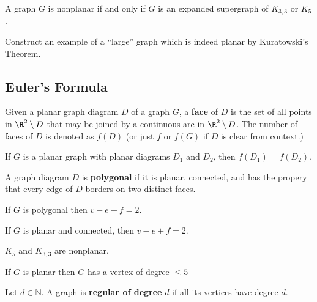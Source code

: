 \begin{theorem} A graph $G$ is nonplanar if and only if $G$ is an expanded supergraph of $K_{3,3}$ or $K_5$.
\end{theorem}

\begin{example} Construct an example of a ``large'' graph which is indeed planar by Kuratowski's Theorem.
\end{example}

\subsection{Euler's Formula}
\begin{definition} Given a planar graph diagram $D$ of a graph $G$, a \textbf{face} of $D$ is the set of all points in $\R^2 \setminus D$ that may be joined by a continuous arc in $\R^2 \setminus D$.  The number of faces of $D$ is denoted as $f(D)$ (or just $f$ or $f(G)$ if $D$ is clear from context.)
\end{definition}

\begin{theorem} If $G$ is a planar graph with planar diagrams $D_1$ and $D_2$, then $f(D_1) = f(D_2)$.
\end{theorem}

\begin{definition} A graph diagram $D$ is \textbf{polygonal} if it is planar, connected, and has the propery that every edge of $D$ borders on two distinct faces.
\end{definition}

\begin{theorem}[Euler]\label{thm:euler} If $G$ is polygonal then $v-e+f = 2$.
\end{theorem}

\begin{corollary} If $G$ is planar and connected, then $v-e+f = 2$.
\end{corollary}

\begin{corollary} $K_5$ and $K_{3,3}$ are nonplanar.
\end{corollary}

\begin{theorem} If $G$ is planar then $G$ has a vertex of degree $\leq 5$
\end{theorem}

\begin{definition} Let $d\in \mathbb{N}$.  A graph is \textbf{regular of degree} $d$ if all its vertices have degree $d$.
\end{definition}

